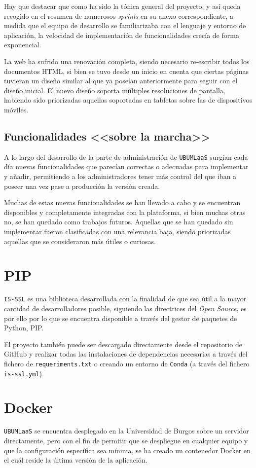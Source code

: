 Hay que destacar que como ha sido la tónica general del proyecto, y así queda recogido en el resumen de numerosos \textit{sprints} en su anexo correspondiente, a medida que el equipo de desarrollo se familiarizaba con el lenguaje y entorno de aplicación, la velocidad de implementación de funcionalidades crecía de forma exponencial.

La web ha sufrido una renovación completa, siendo necesario re-escribir todos los documentos HTML, si bien se tuvo desde un inicio en cuenta que ciertas páginas tuvieran un diseño similar al que ya poseían anteriormente para seguir con el diseño inicial. El nuevo diseño soporta múltiples resoluciones de pantalla, habiendo sido priorizadas aquellas soportadas en tabletas sobre las de dispositivos móviles.

\subsection{Funcionalidades <<sobre la marcha>>}
A lo largo del desarrollo de la parte de administración de \texttt{UBUMLaaS} surgían cada día nuevas funcionalidades que parecían correctas o adecuadas para implementar y añadir, permitiendo a los administradores tener más control del que iban a poseer una vez pase a producción la versión creada.

Muchas de estas nuevas funcionalidades se han llevado a cabo y se encuentran disponibles y completamente integradas con la plataforma, si bien muchas otras no, se han quedado como trabajos futuros. Aquellas que se han quedado sin implementar fueron clasificadas con una relevancia baja, siendo priorizadas aquellas que se consideraron más útiles o curiosas.

\section{PIP}
\texttt{IS-SSL} es una biblioteca desarrollada con la finalidad de que sea útil a la mayor cantidad de desarrolladores posible, siguiendo las directrices del \textit{Open Source}, es por ello por lo que se encuentra disponible a través del gestor de paquetes de Python, PIP. 

El proyecto también puede ser descargado directamente desde el repositorio de GitHub y realizar todas las instalaciones de dependencias necesarias a través del fichero de \texttt{requeriments.txt} o creando un entorno de \texttt{Conda} (a través del fichero \texttt{is-ssl.yml}).

\section{Docker}
\texttt{UBUMLaaS} se encuentra desplegado en la Universidad de Burgos sobre un servidor directamente, pero con el fin de permitir que se despliegue en cualquier equipo y que la configuración específica sea mínima, se ha creado un contenedor Docker en el cuál reside la última versión de la aplicación. 

